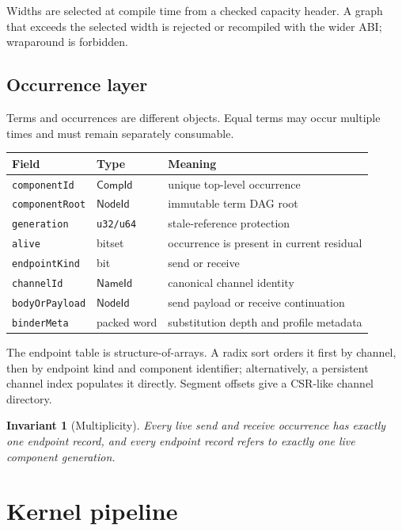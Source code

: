 \documentclass[11pt]{article}
\newtheorem{invariant}[requirement]{Invariant}
\newcommand{\code}[1]{\texttt{#1}}
\newcommand{\NameId}{\ensuremath{\mathsf{NameId}}}
\newcommand{\NodeId}{\ensuremath{\mathsf{NodeId}}}
\newcommand{\CompId}{\ensuremath{\mathsf{CompId}}}
\begin{document}
Widths are selected at compile time from a checked capacity header.  A graph
that exceeds the selected width is rejected or recompiled with the wider ABI;
wraparound is forbidden.

\subsection{Occurrence layer}

Terms and occurrences are different objects.  Equal terms may occur multiple
times and must remain separately consumable.

\begin{center}
\begin{tabularx}{\textwidth}{@{}l l X@{}}
\toprule
Field & Type & Meaning\\
\midrule
\code{componentId} & \CompId{} & unique top-level occurrence\\
\code{componentRoot} & \NodeId{} & immutable term DAG root\\
\code{generation} & \code{u32/u64} & stale-reference protection\\
\code{alive} & bitset & occurrence is present in current residual\\
\code{endpointKind} & bit & send or receive\\
\code{channelId} & \NameId{} & canonical channel identity\\
\code{bodyOrPayload} & \NodeId{} & send payload or receive continuation\\
\code{binderMeta} & packed word & substitution depth and profile metadata\\
\bottomrule
\end{tabularx}
\end{center}

The endpoint table is structure-of-arrays.  A radix sort orders it first by
channel, then by endpoint kind and component identifier; alternatively, a
persistent channel index populates it directly.  Segment offsets give a
CSR-like channel directory.

\begin{invariant}[Multiplicity]
Every live send and receive occurrence has exactly one endpoint record, and
every endpoint record refers to exactly one live component generation.
\end{invariant}

\section{Kernel pipeline}
\end{document}
